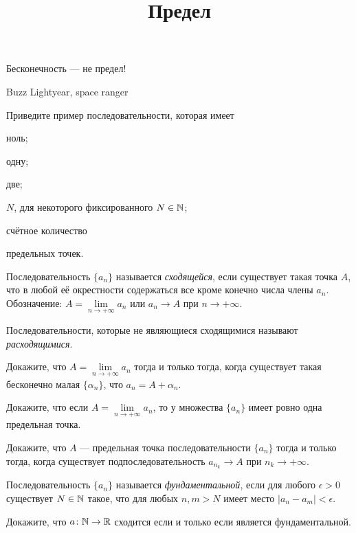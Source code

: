 \documentclass[a4paper, 12pt, num=30]{listok}
\begin{document}
\title{Предел}
\maketitle{}

\epigraph{%
    Бесконечность --- не предел!
}{%
    Buzz Lightyear, space ranger
}
\begin{problem}
    Приведите пример последовательности, которая имеет
    \begin{probparts}
        \item ноль;
        \item одну;
        \item две;
        \item $N$, для некоторого фиксированного $N \in \mathbb{N}$;
        \item счётное количество
    \end{probparts}
    предельных точек.
\end{problem}
\begin{definition}
    Последовательность $\{a_n\}$ называется \textit{сходящейся}, если существует такая точка $A$, что в любой её окрестности содержаться все кроме конечно числа члены $a_n$.
    Обозначение: $A = \lim\limits_{n \to +\infty} a_n$ или $a_n \to A$ при $n \to +\infty$.

    Последовательности, которые не являющиеся сходящимися называют \textit{расходящимися}.
\end{definition}
\begin{problem}
    Докажите, что $A = \lim\limits_{n \to +\infty} a_n$ тогда и только тогда, когда существует такая бесконечно малая $\{\alpha_n\}$, что $a_n = A + \alpha_n$.
\end{problem}
\begin{problem}
    Докажите, что если $A = \lim\limits_{n \to +\infty} a_n$, то у множества $\{a_n\}$ имеет ровно одна предельная точка.
\end{problem}
\begin{problem}
    Докажите, что $A$ --- предельная точка последовательности $\{a_n\}$ тогда и только тогда, когда существует подпоследовательность $a_{n_k} \to A$ при $n_k \to +\infty$.
\end{problem}
\begin{definition}
    Последовательность $\{a_n\}$ называется \textit{фундаментальной}, если для любого $\epsilon > 0$ существует $N \in \mathbb{N}$ такое,
    что для любых $n, m > N$ имеет место  $|a_n - a_m| < \epsilon$.
\end{definition}
\begin{problem}
    Докажите, что $a \colon \mathbb{N} \to \mathbb{R}$ сходится если и только если является фундаментальной.
\end{problem}
\end{document}
